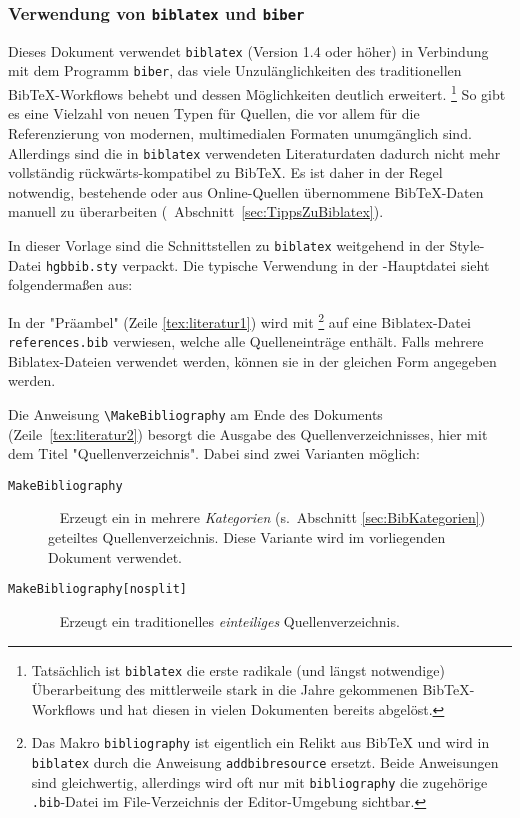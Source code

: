 \subsubsection{Verwendung von \texttt{biblatex} und \texttt{biber}}

Dieses Dokument verwendet \texttt{biblatex} (Version 1.4 oder höher) in
Verbindung mit dem Programm \texttt{biber}, das viele Unzulänglichkeiten des
traditionellen BibTeX-Workflows behebt und dessen Möglichkeiten deutlich
erweitert.%
\footnote{Tatsächlich ist \texttt{biblatex} die erste radikale (und längst
notwendige) Überarbeitung des mittlerweile stark in die Jahre gekommenen
BibTeX-Workflows und hat diesen in vielen Dokumenten bereits abgelöst.}
So gibt es eine Vielzahl von neuen Typen für Quellen, die vor allem für die
Referenzierung von modernen, multimedialen Formaten unumgänglich sind.
Allerdings sind die in \texttt{biblatex} verwendeten Literaturdaten dadurch
nicht mehr vollständig rückwärts-kompatibel zu BibTeX. Es ist daher in der
Regel notwendig, bestehende oder aus Online-Quellen übernommene BibTeX-Daten
manuell zu überarbeiten (\sa\ Abschnitt~\ref{sec:TippsZuBiblatex}).

In dieser Vorlage sind die Schnittstellen zu \texttt{biblatex} weitgehend in
der Style-Datei \nolinkurl{hgbbib.sty} verpackt. Die typische Verwendung in
der \latex-Haupt\-datei sieht folgendermaßen aus:
%
%
In der "Präambel" (Zeile \ref{tex:literatur1}) wird mit
\verb!!%
\footnote{Das Makro \texttt{{\bs}bibliography} ist eigentlich ein Relikt aus
BibTeX und wird in \texttt{biblatex} durch die Anweisung
\texttt{{\bs}addbibresource} ersetzt. Beide Anweisungen sind gleichwertig,
allerdings wird oft nur mit \texttt{{\bs}bibliography} die zugehörige
\texttt{.bib}-Datei im File-Verzeichnis der Editor-Umgebung sichtbar.}
auf eine Biblatex-Datei \nolinkurl{references.bib} verwiesen, welche alle
Quelleneinträge enthält.
Falls mehrere Biblatex-Dateien verwendet werden, können sie in der gleichen
Form angegeben werden.

Die Anweisung \verb!\MakeBibliography! am Ende des Dokuments
(Zeile~\ref{tex:literatur2}) besorgt die Ausgabe des Quellenverzeichnisses,
hier mit dem Titel "Quellenverzeichnis". Dabei sind zwei Varianten möglich:
%
\begin{description}
    \item[\texttt{{\bs}MakeBibliography}] ~ \newline
    Erzeugt ein in mehrere \emph{Kategorien} (s.\ Abschnitt
    \ref{sec:BibKategorien}) geteiltes Quellenverzeichnis. Diese
    Variante wird im vorliegenden Dokument verwendet.
%
    \item[\texttt{{\bs}MakeBibliography[nosplit]}] ~ \newline
    Erzeugt ein traditionelles \emph{einteiliges} Quellenverzeichnis.
\end{description}


